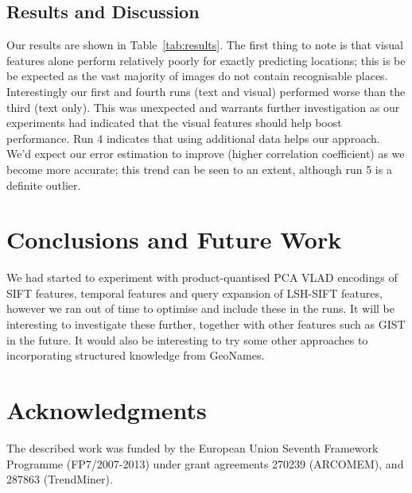 \documentclass{../acm_proc_article-me11_tweaked}
\begin{document}
\subsection{Results and Discussion}
Our results are shown in Table~\ref{tab:results}. The first thing to note is that visual features alone perform relatively poorly for exactly predicting locations; this is be be expected as the vast majority of images do not contain recognisable places. Interestingly our first and fourth runs (text and visual) performed worse than the third (text only). This was unexpected and warrants further investigation as our experiments had indicated that the visual features should help boost performance. Run 4 indicates that using additional data helps our approach. We'd expect our error estimation to improve (higher correlation coefficient) as we become more accurate; this trend can be seen to an extent, although run 5 is a definite outlier.

\section{Conclusions and Future Work}
We had started to experiment with product-quantised PCA VLAD encodings of SIFT features, temporal features and query expansion of LSH-SIFT features, however we ran out of time to optimise and include these in the runs. It will be interesting to investigate these further, together with other features such as GIST in the future. It would also be interesting to try some other approaches to incorporating structured knowledge from GeoNames.

\section{Acknowledgments}
The described work was funded by the European Union Seventh Framework Programme (FP7/2007-2013) under grant agreements 270239 (ARCOMEM), and 287863 (TrendMiner).




\end{document}
